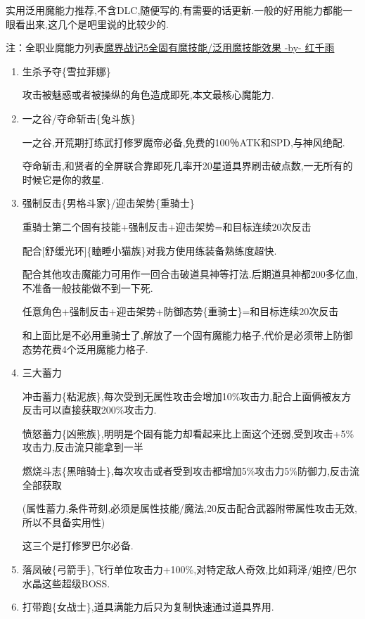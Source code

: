 	实用泛用魔能力推荐,不含DLC,随便写的,有需要的话更新.一般的好用能力都能一眼看出来,这几个是吧里说的比较少的.

	注：全职业魔能力列表\href{http://tieba.baidu.com/p/3765501530}{魔界战记5全固有魔技能/泛用魔技能效果 -by- 红千雨}

	\begin{enumerate}
		\item
		生杀予夺\{雪拉菲娜\}

		攻击被魅惑或者被操纵的角色造成即死,本文最核心魔能力.

		\item
		一之谷/夺命斩击\{兔斗族\}

		一之谷,开荒期打练武打修罗魔帝必备,免费的100％ATK和SPD,与神风绝配.

		夺命斩击,和贤者的全屏联合靠即死几率开20星道具界刷击破点数,一无所有的时候它是你的救星.

		\item
		强制反击\{男格斗家\}/迎击架势\{重骑士\}

		重骑士第二个固有技能+强制反击+迎击架势=和目标连续20次反击

		配合[舒缓光环]\{瞌睡小猫族\}对我方使用练装备熟练度超快.

		配合其他攻击魔能力可用作一回合击破道具神等打法.后期道具神都200多亿血,不准备一般技能做不到一下死.

		任意角色+强制反击+迎击架势+防御态势\{重骑士\}=和目标连续20次反击

		和上面比是不必用重骑士了,解放了一个固有魔能力格子,代价是必须带上防御态势花费4个泛用魔能力格子.

		\item
		三大蓄力

		冲击蓄力\{粘泥族\},每次受到无属性攻击会增加10\%攻击力,配合上面俩被友方反击可以直接获取200\%攻击力.

		愤怒蓄力\{凶熊族\},明明是个固有能力却看起来比上面这个还弱,受到攻击+5\%攻击力,反击流只能拿到一半

		燃烧斗志\{黑暗骑士\},每次攻击或者受到攻击都增加5\%攻击力5\%防御力,反击流全部获取

		(属性蓄力,条件苛刻,必须是属性技能/魔法,20反击配合武器附带属性攻击无效,所以不具备实用性)

		这三个是打修罗巴尔必备.

		\item
		落凤破\{弓箭手\},飞行单位攻击力+100\%,对特定敌人奇效,比如莉泽/姐控/巴尔水晶这些超级BOSS.

		\item
		打带跑\{女战士\},道具满能力后只为复制快速通过道具界用.

	\end{enumerate}
	
